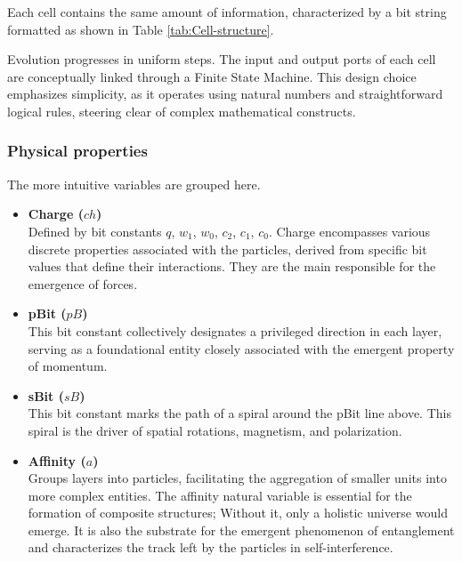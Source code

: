 \documentclass[12pt,english]{article}
\begin{document}
Each cell contains the same amount of information, characterized by a bit string formatted as shown in Table \ref{tab:Cell-structure}.

Evolution progresses in uniform steps. The input and output ports of each cell are conceptually linked through a Finite State Machine. This design choice emphasizes simplicity, as it operates using natural numbers and straightforward logical rules, steering clear of complex mathematical constructs.

\subsubsection{Physical properties}
The more intuitive variables are grouped here.
\begin{itemize}
    \item \textbf{Charge ($ch$)} \\
Defined by bit constants $q$, $w_{1}$, $w_{0}$, $c_{2}$, $c_{1}$, $c_{0}$.
Charge encompasses various discrete properties associated with the particles, derived from specific bit values that define their interactions. They are the main responsible for the emergence of forces.

\item \textbf{pBit ($pB$)} \\
This bit constant collectively designates a privileged direction in each layer, serving as a foundational entity closely associated with the emergent property of momentum.

\item \textbf{sBit ($sB$)} \\
This bit constant marks the path of a spiral around the pBit line above. This spiral is the driver of spatial rotations, magnetism, and polarization.

\item \textbf{Affinity ($a$)} \\
    Groups layers into particles, facilitating the aggregation of smaller units into more complex entities. The affinity natural variable is essential for the formation of composite structures; Without it, only a holistic universe would emerge. It is also the substrate for the emergent phenomenon of entanglement and characterizes the track left by the particles in self-interference.
\end{itemize}
\end{document}
